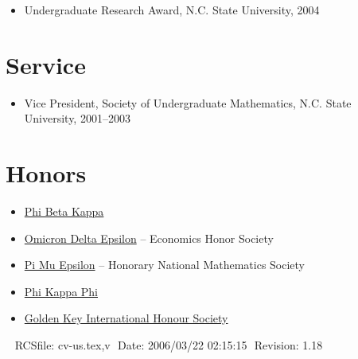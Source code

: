 \documentclass[overlapped,line,final,11pt,letterpaper]{res}
\def\Cplusplus{{\rm C\raise.5ex\hbox{\small ++}}}
\begin{document}
\begin{resume}
\begin{itemize}
\item Undergraduate Research Award, N.C. State University, 2004
\end{itemize}


\section{\bf Service}

\begin{itemize}
\item Vice President, Society of Undergraduate Mathematics, N.C. State
  University, 2001--2003
\end{itemize}


\section{\bf Honors}
\begin{itemize}
\item \href{http://www.pbk.org/}{Phi Beta Kappa}
\item \href{http://www.cba.ua.edu/~ode/}
  {Omicron Delta Epsilon} -- Economics Honor Society
\item \href{http://www.pme-math.org/}
  {Pi Mu Epsilon} -- Honorary National Mathematics Society
\item \href{http://www.phikappaphi.org/}{Phi Kappa Phi}
\item \href{http://www.goldenkey.org}{Golden Key International Honour Society}
\end{itemize}




\begin{center}
\vspace{\fill}\ \newline
{\tiny \rm $ $RCSfile: cv-us.tex,v $ $ }
{\tiny \rm $ $Date: 2006/03/22 02:15:15 $ $ }
{\tiny \rm $ $Revision: 1.18 $ $ }
\end{center}

\end{resume}
\end{document}
